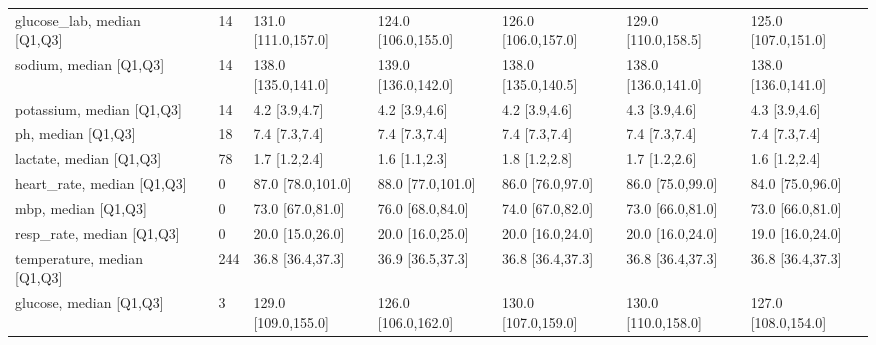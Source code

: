 \begin{tabular}{llllllll}
glucose\_lab, median [Q1,Q3] &                                   &              14 &       131.0 [111.0,157.0] &       124.0 [106.0,155.0] &      126.0 [106.0,157.0] &       129.0 [110.0,158.5] &      125.0 [107.0,151.0] \\
sodium, median [Q1,Q3] &                                   &              14 &       138.0 [135.0,141.0] &       139.0 [136.0,142.0] &      138.0 [135.0,140.5] &       138.0 [136.0,141.0] &      138.0 [136.0,141.0] \\
potassium, median [Q1,Q3] &                                   &              14 &             4.2 [3.9,4.7] &             4.2 [3.9,4.6] &            4.2 [3.9,4.6] &             4.3 [3.9,4.6] &            4.3 [3.9,4.6] \\
ph, median [Q1,Q3] &                                   &              18 &             7.4 [7.3,7.4] &             7.4 [7.3,7.4] &            7.4 [7.3,7.4] &             7.4 [7.3,7.4] &            7.4 [7.3,7.4] \\
lactate, median [Q1,Q3] &                                   &              78 &             1.7 [1.2,2.4] &             1.6 [1.1,2.3] &            1.8 [1.2,2.8] &             1.7 [1.2,2.6] &            1.6 [1.2,2.4] \\
heart\_rate, median [Q1,Q3] &                                   &               0 &         87.0 [78.0,101.0] &         88.0 [77.0,101.0] &         86.0 [76.0,97.0] &          86.0 [75.0,99.0] &         84.0 [75.0,96.0] \\
mbp, median [Q1,Q3] &                                   &               0 &          73.0 [67.0,81.0] &          76.0 [68.0,84.0] &         74.0 [67.0,82.0] &          73.0 [66.0,81.0] &         73.0 [66.0,81.0] \\
resp\_rate, median [Q1,Q3] &                                   &               0 &          20.0 [15.0,26.0] &          20.0 [16.0,25.0] &         20.0 [16.0,24.0] &          20.0 [16.0,24.0] &         19.0 [16.0,24.0] \\
temperature, median [Q1,Q3] &                                   &             244 &          36.8 [36.4,37.3] &          36.9 [36.5,37.3] &         36.8 [36.4,37.3] &          36.8 [36.4,37.3] &         36.8 [36.4,37.3] \\
glucose, median [Q1,Q3] &                                   &               3 &       129.0 [109.0,155.0] &       126.0 [106.0,162.0] &      130.0 [107.0,159.0] &       130.0 [110.0,158.0] &      127.0 [108.0,154.0] \\
\bottomrule
\end{tabular}
